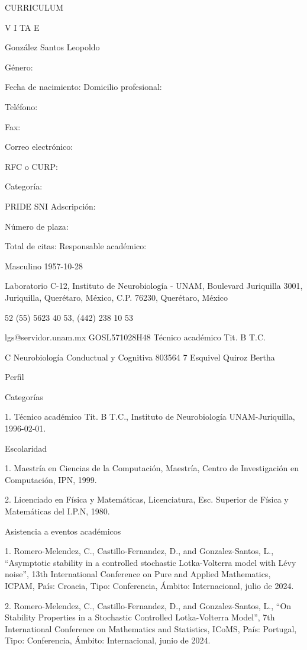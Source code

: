 \documentclass[12pt]{article}
\begin{document}
CURRICULUM

V I TA E

González Santos Leopoldo

Género:

Fecha de nacimiento: Domicilio profesional:

Teléfono:

Fax:

Correo electrónico:

RFC o CURP:

Categoría:

PRIDE SNI Adscripción:

Número de plaza:

Total de citas: Responsable académico:

Masculino 1957-10-28

Laboratorio C-12, Instituto de Neurobiología - UNAM, Boulevard Juriquilla 3001, Juriquilla, Querétaro, México, C.P. 76230, 
Querétaro, México

52 (55) 5623 40 53, (442) 238 10 53

lgs@servidor.unam.mx GOSL571028H48 Técnico académico Tit. B T.C.

C Neurobiología Conductual y Cognitiva 803564 7 Esquivel Quiroz Bertha

Perfil

Categorías

1. Técnico académico Tit. B T.C., Instituto de Neurobiología UNAM-Juriquilla, 1996-02-01.

Escolaridad

1. Maestría en Ciencias de la Computación, Maestría, Centro de Investigación en Computación, IPN, 1999.

2. Licenciado en Física y Matemáticas, Licenciatura, Esc. Superior de Física y Matemáticas del I.P.N, 1980.



Asistencia a eventos académicos

1. Romero-Melendez, C., Castillo-Fernandez, D., and Gonzalez-Santos, L., “Asymptotic stability in a controlled stochastic 
Lotka-Volterra model with Lévy noise”, 13th International Conference on Pure and Applied Mathematics, ICPAM, País: Croacia, 
Tipo: Conferencia, Ámbito: Internacional, julio de 2024.

2. Romero-Melendez, C., Castillo-Fernandez, D., and Gonzalez-Santos, L., “On Stability Properties in a Stochastic 
Controlled Lotka-Volterra Model”, 7th International Conference on Mathematics and Statistics, ICoMS, País: Portugal, Tipo: 
Conferencia, Ámbito: Internacional, junio de 2024.
\end{document}
